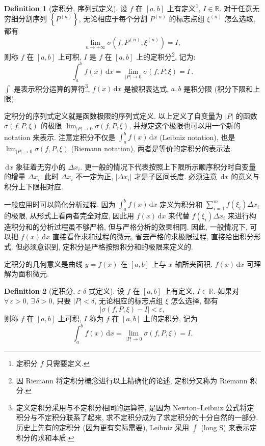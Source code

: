 \documentclass{book}
\newcommand{\Exists}{\exists\,}
\newcommand{\Any}{\forall\,}
\newcommand{\set}[1]{\left\{#1\right\}}
\newcommand{\dd}{\,\mathrm{d}}
\newcommand{\abs}[1]{\left\lvert #1 \right\rvert}
\newcommand{\R}{\mathbb{R}}
\numberwithin{equation}{section}
\numberwithin{figure}{section}
\theoremstyle{definition}
\newtheorem{definition}{Definition}
\begin{document}
\begin{definition}[定积分, 序列式定义]
  设 $f$ 在 $[a,b]$ 上有定义\footnote{定积分 $f$ 只需要定义.}, $I\in\R$. 对于任意无穷细分割序列 $\set{P^{(n)}}$, 无论相应于每个分割 $P^{(n)}$ 的标志点组 $\xi^{(n)}$ 怎么选取, 都有
  \begin{equation*}
    \lim_{n\to+\infty}\sigma(f,P^{(n)},\xi^{(n)})=I,
  \end{equation*}
  则称 $f$ 在 $[a,b]$ 上可积, $I$ 是 $f$ 在 $[a,b]$ 上的定积分\footnote{因 Riemann 将定积分概念进行以上精确化的论述, 定积分又称为 Riemann 积分.}, 记为:
  \begin{equation*}
    \int_{a}^{b} f(x) \dd x=\lim_{\abs{P}\to0}\sigma(f,P,\xi)=I\,.
  \end{equation*}
  $\int$ 是表示积分运算的算符\footnote{定义定积分采用与不定积分相同的运算符, 是因为 Newton--Leibniz 公式将定积分与不定积分联系了起来, 求不定积分成为了求定积分的十分自然的一部分. 历史上先有的定积分 (因为更有实际需要), Leibniz 采用 $\int$ (long S) 来表示定积分的求和本质.}, $f(x)\dd x$ 是被积表达式, $a,b$ 是积分限 (积分下限和上限). 
\end{definition}

定积分的序列式定义就是函数极限的序列式定义. 以上定义了自变量为 $\abs{P}$ 的函数 $\sigma(f,P,\xi)$ 的极限 $\lim_{\abs{P}\to0}\sigma(f,P,\xi)$, 并规定这个极限也可以用一个新的 notation 来表示. 注意定积分不仅是 $\int_{a}^{b} f(x) \dd x$ (Leibniz notation), 也是 $\lim_{\abs{P}\to0}\sigma(f,P,\xi)$ (Riemann notation), 两者是等价的定积分的表示法.

$\dd x$ 象征着无穷小的 $\Delta x_i$. 更一般的情况下代表按照上下限所示顺序积分时自变量的增量 $\Delta x_i$. 此时 $\Delta x_i$ 不一定为正, $\abs{\Delta x_i}$ 才是子区间长度.
必须注意 $\dd x$ 的意义与积分上下限相对应.

一般应用时可以简化分析过程. 因为 $\int_{a}^{b} f(x) \dd x$ 定义为积分和 $\sum_{i=1}^{m}f(\xi_i)\Delta x_i$ 的极限, 从形式上看两者完全对应, 因此用 $f(x)\dd x$ 来代替 $f(\xi_i)\Delta x_i$ 来进行构造积分和的分析过程虽不够严格, 但与严格分析的效果相同. 因此, 一般情况下, 可以把 $f(x)\dd x$ 直接看作求和过程的微元, 省去严格的求极限过程, 直接给出积分形式. 但必须意识到, 定积分是严格按照积分和的极限来定义的.

定积分的几何意义是曲线 $y=f(x)$ 在 $[a,b]$ 上与 $x$ 轴所夹面积. $f(x)\dd x$ 可理解为面积微元.

\begin{definition}[定积分, $\varepsilon$-$\delta$ 式定义]
  设 $f$ 在 $[a,b]$ 上有定义, $I\in\R$. 如果对 $\Any \varepsilon>0$, $\Exists \delta>0$, 只要 $\abs{P}<\delta$, 无论相应的标志点组 $\xi$ 怎么选择, 都有
  \begin{equation*}
    \abs{\sigma(f,P,\xi)-I}<\varepsilon,
  \end{equation*}
  则称 $f$ 在 $[a,b]$ 上可积, $I$ 称为 $f$ 在 $[a,b]$ 上的定积分, 记为
  \begin{equation*}
    \int_{a}^{b} f(x) \dd x=\lim_{\abs{P}\to0}\sigma(f,P,\xi)=I.
  \end{equation*}
\end{definition}
\end{document}
